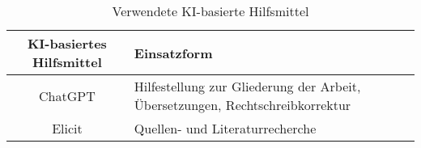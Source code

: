 \documentclass[a4paper, 12pt]{article}
\begin{document}
    
    \newpage

    
    \tableofcontents
    \newpage

    
    \newpage

    
    
    
    
    
    
    \newpage

    
    \newpage

    \setcounter{page}{2}

    \printbibliography

    \begin{table}[h]
        \centering
        \begin{tabular}{|c|m{15em}|}
            \hline
            KI-basiertes Hilfsmittel & Einsatzform \\ 
            \hline
            ChatGPT & Hilfestellung zur Gliederung der Arbeit, Übersetzungen, Rechtschreibkorrektur \\ 
            \hline
            Elicit & Quellen- und Literaturrecherche \\ 
            \hline
        \end{tabular}
        \caption{Verwendete KI-basierte Hilfsmittel}
    \end{table}
    \newpage

    
\end{document}
